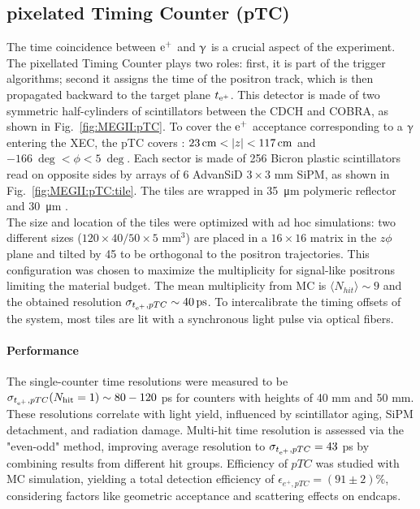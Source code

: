 \begin{refsection}
    \subsection{pixelated Timing Counter (pTC)}
        The time coincidence between $\text{e}^+$ and $\upgamma$ is a crucial aspect of the experiment. 
        The pixellated Timing Counter plays two roles: first, it is part of the trigger algorithms; second it assigns the time of the positron track, which is then propagated backward to the target plane $t_{\text{e}^+}$. 
        This detector is made of two symmetric half-cylinders of scintillators between the CDCH and COBRA, as shown in Fig.~\ref{fig:MEGII:pTC}.
        To cover the $\text{e}^+$ acceptance corresponding to a $\upgamma$ entering the XEC, the pTC covers : $\SI{23}{cm}<\abs{z}<\SI{117}{cm}$ and $\SI{-166}{\deg}<\phi<\SI{5}{\deg}$. 
        Each sector is made of 256 Bicron  plastic scintillators read on opposite sides by arrays of 6 AdvanSiD $3\times3$ mm SiPM, as shown in Fig.~\ref{fig:MEGII:pTC:tile}.
        The tiles are wrapped in \SI{35}{\micro m} polymeric reflector and \SI{30}{\micro m} \tedlar.\\
        The size and location of the tiles were optimized with ad hoc simulations: two different sizes ($120\times40/50\times5$ mm$^3$)  are placed in a $16\times16$ matrix in the $z\phi$ plane and tilted by \SI{45}{\deg} to be orthogonal to the positron trajectories.
        This configuration was chosen to maximize the multiplicity for signal-like positrons limiting the material budget.
        The mean multiplicity from MC is $\langle N_{hit} \rangle\sim 9$ and the obtained resolution $\sigma_{t_{\Ae}, pTC} \sim \SI{40}{\pico s}$.
        To intercalibrate the timing offsets of the system, most tiles are lit with a synchronous light pulse via optical fibers.
        
        \paragraph{Performance} The single-counter time resolutions were measured to be $\sigma_{t_{\text{e}^+}, pTC}(N_{\text{hit}} = 1) \sim 80-120$ ps for counters with heights of 40 mm and 50 mm. These resolutions correlate with light yield, influenced by scintillator aging, SiPM detachment, and radiation damage.
        Multi-hit time resolution is assessed via the "even-odd" method, improving average resolution to $\sigma_{t_{\text{e}^+}, pTC} = 43$ ps by combining results from different hit groups. 
        Efficiency of $pTC$ was studied with MC simulation, yielding a total detection efficiency of $\epsilon_{e^+, pTC} = (91 \pm 2)\%$, considering factors like geometric acceptance and scattering effects on endcaps.\\


\end{refsection}
